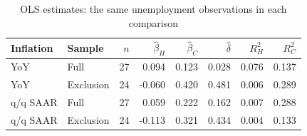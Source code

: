 \begin{table}[H]
\centering\small
\caption{OLS estimates: the same unemployment observations in each comparison}
\label{tab:regression}
\begin{tabular}{llrrrrrr}
\toprule
Inflation & Sample & $n$ & $\hat\beta_H$ & $\hat\beta_C$ & $\hat\delta$ & $R_H^2$ & $R_C^2$\\
\midrule
YoY & Full & 27 & 0.094 & 0.123 & 0.028 & 0.076 & 0.137\\
YoY & Exclusion & 24 & -0.060 & 0.420 & 0.481 & 0.006 & 0.289\\
q/q SAAR & Full & 27 & 0.059 & 0.222 & 0.162 & 0.007 & 0.288\\
q/q SAAR & Exclusion & 24 & -0.113 & 0.321 & 0.434 & 0.004 & 0.133\\
\bottomrule
\end{tabular}
\end{table}
